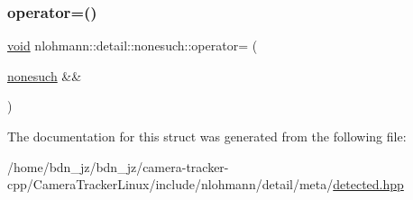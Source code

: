 \subsubsection{\texorpdfstring{operator=()}{operator=()}\hspace{0.1cm}{\footnotesize\ttfamily [2/2]}}
{\footnotesize\ttfamily \hyperlink{namespacenlohmann_1_1detail_a59fca69799f6b9e366710cb9043aa77d}{void} nlohmann\+::detail\+::nonesuch\+::operator= (\begin{DoxyParamCaption}\item[{\hyperlink{structnlohmann_1_1detail_1_1nonesuch}{nonesuch} \&\&}]{ }\end{DoxyParamCaption})\hspace{0.3cm}{\ttfamily [delete]}}



The documentation for this struct was generated from the following file\+:\begin{DoxyCompactItemize}
\item 
/home/bdn\+\_\+jz/bdn\+\_\+jz/camera-\/tracker-\/cpp/\+Camera\+Tracker\+Linux/include/nlohmann/detail/meta/\hyperlink{detected_8hpp}{detected.\+hpp}\end{DoxyCompactItemize}
